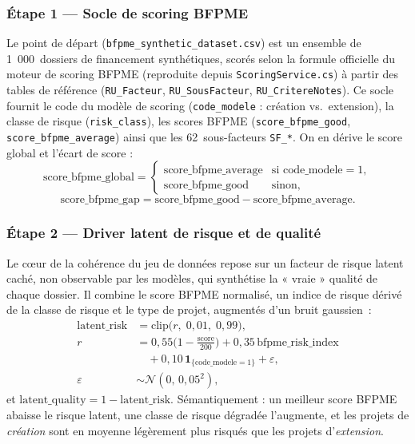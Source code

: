\documentclass[a4paper,12pt,oneside]{report}
\begin{document}
\subsubsection{Étape 1 --- Socle de scoring BFPME}

Le point de départ (\texttt{bfpme\_synthetic\_dataset.csv}) est un ensemble de
1~000~dossiers de financement synthétiques, scorés selon la formule officielle
du moteur de scoring BFPME (reproduite depuis \texttt{ScoringService.cs}) à partir des tables
de référence (\texttt{RU\_Facteur}, \texttt{RU\_SousFacteur}, \texttt{RU\_CritereNotes}).
Ce socle fournit le code du modèle de scoring (\texttt{code\_modele} : création vs.\ extension),
la classe de risque (\texttt{risk\_class}), les scores BFPME (\texttt{score\_bfpme\_good},
\texttt{score\_bfpme\_average}) ainsi que les 62~sous-facteurs \texttt{SF\_*}. On en dérive le
score global et l'écart de score :
\[
\text{score\_bfpme\_global} =
\begin{cases}
\text{score\_bfpme\_average} & \text{si } \text{code\_modele} = 1,\\
\text{score\_bfpme\_good}    & \text{sinon,}
\end{cases}
\]
\[
\text{score\_bfpme\_gap} =
\text{score\_bfpme\_good} - \text{score\_bfpme\_average}.
\]

\subsubsection{Étape 2 --- Driver latent de risque et de qualité}

Le c\oe ur de la cohérence du jeu de données repose sur un facteur de risque latent
caché, non observable par les modèles, qui synthétise la « vraie » qualité de chaque dossier.
Il combine le score BFPME normalisé, un indice de risque dérivé de la classe de risque et le
type de projet, augmentés d'un bruit gaussien~:
\[
\begin{aligned}
\text{latent\_risk} &= \mathrm{clip}\big(r,\; 0{,}01,\; 0{,}99\big), \\[2pt]
r &= 0{,}55\Big(1-\tfrac{\text{score}}{200}\Big)
     + 0{,}35\,\text{bfpme\_risk\_index} \\
  &\quad + 0{,}10\,\mathbf{1}_{\{\text{code\_modele}=1\}}
     + \varepsilon, \\[2pt]
\varepsilon &\sim \mathcal{N}(0,\,0{,}05^2),
\end{aligned}
\]
et $\text{latent\_quality} = 1 - \text{latent\_risk}$. Sémantiquement : un meilleur score BFPME
abaisse le risque latent, une classe de risque dégradée l'augmente, et les projets de
\textit{création} sont en moyenne légèrement plus risqués que les projets d'\textit{extension}.
\end{document}
